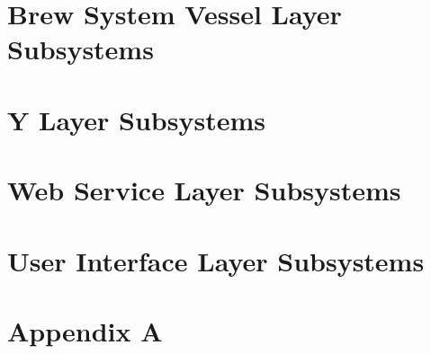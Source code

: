 \documentclass[11pt,letterpaper]{article}
\begin{document}
\section{Brew System Vessel Layer Subsystems}

\newpage
\section{Y Layer Subsystems}

\newpage
\section{Web Service Layer Subsystems}

\newpage
\section{User Interface Layer Subsystems}

\newpage
\section{Appendix A}

\newpage



{}
\end{document}
